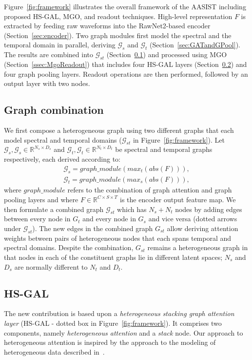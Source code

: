 \documentclass{article}
\begin{document}
Figure~\ref{fig:framework} illustrates the overall framework of the AASIST including proposed HS-GAL, MGO, and readout techniques. 
High-level representation $F$ is extracted by feeding raw waveforms into the RawNet2-based encoder (Section~\ref{sec:encoder}). 
Two graph modules first model the spectral and the temporal domain in parallel, deriving $\mathcal{G}_s$ and $\mathcal{G}_t$ (Section~\ref{sec:GATandGPool}). 
The results are combined into $\mathcal{G}_{st}$ (Section~\ref{ssec:graphCombine}) and processed using MGO (Section~\ref{ssec:MgoReadout}) that includes four HS-GAL layers (Section~\ref{ssec:hetero}) and four graph pooling layers. 
Readout operations are then performed, followed by an output layer with two nodes.

\subsection{Graph combination}
\label{ssec:graphCombine}
We first compose a heterogeneous graph using two different graphs that each model spectral and temporal domains ($\mathcal{G}_{st}$ in Figure~\ref{fig:framework}). 
Let $\mathcal{G}_s, \mathcal{G}_s \in \mathbb{R}^{N_s \times D_s}$ and $\mathcal{G}_t, \mathcal{G}_t \in \mathbb{R}^{N_t \times D_t}$ be spectral and temporal graphs respectively, each derived according to:
\begin{align}
    \mathcal{G}_s = graph\_module(max_t(abs(F))),\\
    \mathcal{G}_t = graph\_module(max_s(abs(F))),
\end{align}
where $graph\_module$ refers to the combination of graph attention and graph pooling layers and where $F \in \mathbb{R}^{C \times S \times T}$ is the encoder output feature map.
We then formulate a combined graph $\mathcal{G}_{st}$ which has $N_s+N_t$ nodes by adding edges between every node in $G_t$ and every node in $G_s$ and vice versa (dotted arrows under $\mathcal{G}_{st}$).
The new edges in the combined graph $G_{st}$ allow deriving attention weights between pairs of heterogeneous nodes that each spans temporal and spectral domains.  
Despite the combination, $G_{st}$ remains a heterogeneous graph in that nodes in each of the constituent graphs lie in different latent spaces;  $N_s$ and $D_s$ are normally different to $N_t$ and $D_t$.   

\subsection{HS-GAL}
\label{ssec:hetero}
The new contribution is based upon a {\em heterogeneous stacking graph attention layer} (HS-GAL - dotted box in Figure~\ref{fig:framework}). 
It comprises two components, namely {\em heterogeneous attention} and a {\em stack} node.
Our approach to heterogeneous attention is inspired by the approach to the modeling of heterogeneous data described in~\cite{wang2019heterogeneous}. 
\end{document}
